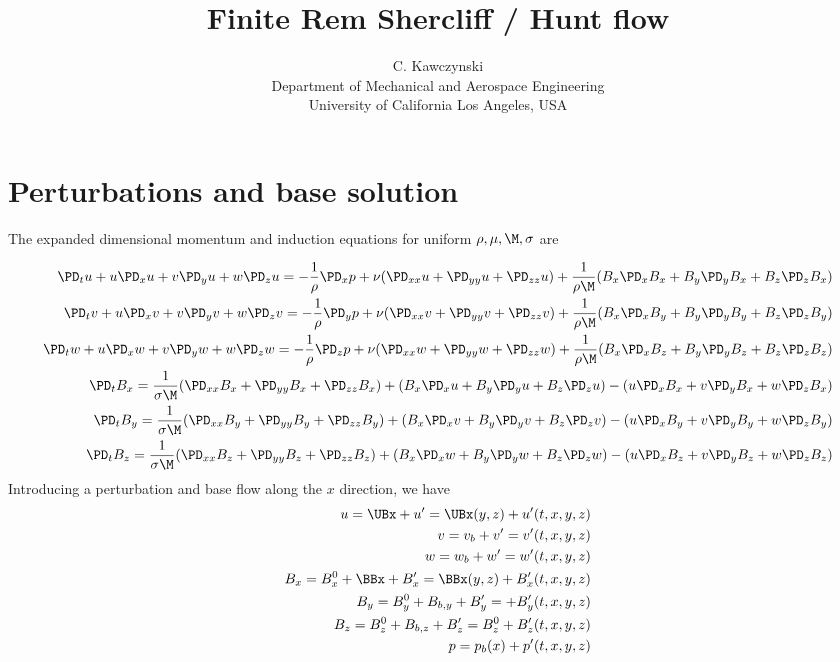 \documentclass[11pt]{article}
\begin{document}
\doublespacing
\title{Finite Rem Shercliff / Hunt flow}
\author{C. Kawczynski \\
Department of Mechanical and Aerospace Engineering \\
University of California Los Angeles, USA\\
}
\maketitle

\section{Perturbations and base solution}
The expanded dimensional momentum and induction equations for uniform $\rho,\mu,\M,\sigma$ are

\begin{equation}\begin{aligned}
\PD_t u+ u\PD_x u + v\PD_y u + w\PD_z u = -\frac{1}{\rho}\PD_x p+ \nu (\PD_{xx} u+\PD_{yy} u+\PD_{zz} u) + \frac{1}{\rho \M} (B_x \PD_x B_x + B_y \PD_y B_x + B_z \PD_z B_x) \\
\PD_t v+ u\PD_x v + v\PD_y v + w\PD_z v = -\frac{1}{\rho}\PD_y p+ \nu (\PD_{xx} v+\PD_{yy} v+\PD_{zz} v) + \frac{1}{\rho \M} (B_x \PD_x B_y + B_y \PD_y B_y + B_z \PD_z B_y) \\
\PD_t w+ u\PD_x w + v\PD_y w + w\PD_z w = -\frac{1}{\rho}\PD_z p+ \nu (\PD_{xx} w+\PD_{yy} w+\PD_{zz} w) + \frac{1}{\rho \M} (B_x \PD_x B_z + B_y \PD_y B_z + B_z \PD_z B_z) \\
\PD_t B_x = \frac{1}{\sigma \M} (\PD_{xx} B_x + \PD_{yy} B_x+\PD_{zz} B_x) + (B_x\PD_x u+B_y\PD_y u+B_z\PD_z u) - (u\PD_x B_x+v\PD_y B_x+w\PD_z B_x) \\
\PD_t B_y = \frac{1}{\sigma \M} (\PD_{xx} B_y + \PD_{yy} B_y+\PD_{zz} B_y) + (B_x\PD_x v+B_y\PD_y v+B_z\PD_z v) - (u\PD_x B_y+v\PD_y B_y+w\PD_z B_y) \\
\PD_t B_z = \frac{1}{\sigma \M} (\PD_{xx} B_z + \PD_{yy} B_z+\PD_{zz} B_z) + (B_x\PD_x w+B_y\PD_y w+B_z\PD_z w) - (u\PD_x B_z+v\PD_y B_z+w\PD_z B_z) \\
\end{aligned} \end{equation}
Introducing a perturbation and base flow along the $x$ direction, we have
\begin{equation}\begin{aligned}
 u = \UBx + u' = \UBx(y,z) + u'(t,x,y,z) \\
 v = v_b + v' =            v'(t,x,y,z) \\
 w = w_b + w' =            w'(t,x,y,z) \\
 B_x = B_x^0 + \BBx + B_x'    = \BBx(y,z) + B_x'(t,x,y,z) \\
 B_y = B_y^0 + B_{b,y} + B_y' =           + B_y'(t,x,y,z) \\
 B_z = B_z^0 + B_{b,z} + B_z' = B_z^0     + B_z'(t,x,y,z) \\
 p   = p_b(x) + p'(t,x,y,z) \\
\end{aligned} \end{equation}
\end{document}
